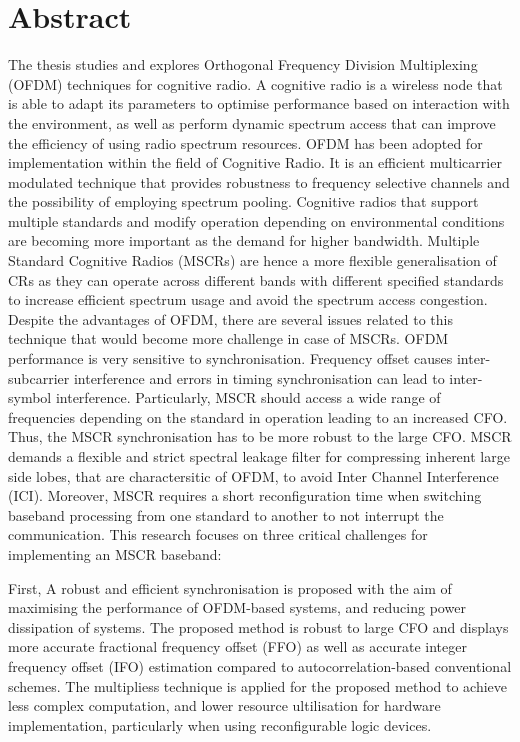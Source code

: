 \chapter* {Abstract}


The thesis studies and explores Orthogonal Frequency Division Multiplexing (OFDM) techniques for cognitive radio. A cognitive radio is a wireless node that is able to adapt its parameters to optimise performance based on interaction with the environment, as well as perform dynamic spectrum access that can improve the efficiency of using radio spectrum resources.
OFDM has been adopted for implementation within the field of Cognitive Radio. It is an efficient multicarrier modulated technique that provides robustness to frequency selective channels and the possibility of employing spectrum pooling. Cognitive radios that support multiple standards and modify operation depending on environmental conditions are becoming more important as the demand for higher bandwidth. Multiple Standard Cognitive Radios (MSCRs) are hence a more flexible generalisation of CRs as they can operate across different bands with different specified standards to increase efficient spectrum usage and avoid the spectrum access congestion.
Despite the advantages of OFDM, there are several issues related to this technique that would become more challenge in case of MSCRs. 
OFDM performance is very sensitive to synchronisation. Frequency offset causes inter-subcarrier interference and errors in timing synchronisation can lead to inter-symbol interference.
Particularly, MSCR should access a wide range of frequencies depending on the standard in operation leading to an increased CFO. Thus, the MSCR synchronisation has to be more robust to the large CFO.
MSCR demands a flexible and strict spectral leakage filter for compressing inherent large side lobes, that are charactersitic of OFDM, to avoid Inter Channel Interference (ICI).
Moreover, MSCR requires a short reconfiguration time when switching baseband processing from one standard to another to not interrupt the communication.
This research focuses on three critical challenges for implementing an MSCR baseband:

First, A robust and efficient synchronisation is proposed with the aim of maximising the performance of OFDM-based systems, and reducing power dissipation of systems.
The proposed method is robust to large CFO and displays more accurate fractional frequency offset (FFO) as well as accurate integer frequency offset (IFO) estimation compared to autocorrelation-based conventional schemes. 
The multipliess technique is applied for the proposed method to achieve less complex computation, and lower resource ultilisation for hardware implementation, particularly when using reconfigurable logic devices.

